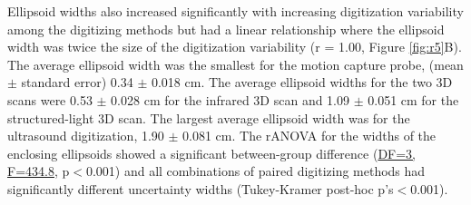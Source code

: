 \documentclass[../thesis_seyed.tex]{subfiles}
\begin{document}
Ellipsoid widths also increased significantly with increasing digitization variability among the digitizing methods but had a linear relationship where the ellipsoid width was twice the size of the digitization variability (r = 1.00, Figure \ref{fig:r5}B). The average ellipsoid width was the smallest for the motion capture probe, (mean $\pm$ standard error) 0.34 $\pm$ 0.018 cm. The average ellipsoid widths for the two 3D scans were 0.53 $\pm$ 0.028 cm for the infrared 3D scan and 1.09 $\pm$ 0.051 cm for the structured-light 3D scan. The largest average ellipsoid width was for the ultrasound digitization, 1.90 $\pm$ 0.081 cm. The rANOVA for the widths of the enclosing ellipsoids showed a significant between-group difference (\ul{DF=3, F=434.8}, p$<$0.001) and all combinations of paired digitizing methods had significantly different uncertainty widths (Tukey-Kramer post-hoc p's$<$0.001).
\end{document}
